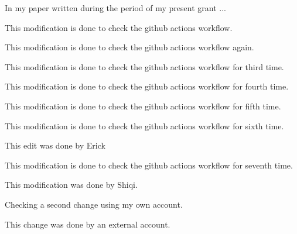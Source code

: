 


In my paper \cite{paper01} written during the period of my present
grant ... 


This modification is done to check the github actions workflow.

This modification is done to check the github actions workflow again.

This modification is done to check the github actions workflow for third time.

This modification is done to check the github actions workflow for fourth time.

This modification is done to check the github actions workflow for fifth time.

This modification is done to check the github actions workflow for sixth time.

This edit was done by Erick

This modification is done to check the github actions workflow for seventh time.

This modification was done by Shiqi.


Checking a second change using my own account.


This change was done by an external account.


